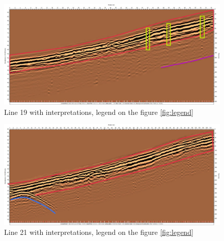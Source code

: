 \begin{figure}
    \centering
    \includegraphics[width=\linewidth]{Images/00_Results/line19_edited.jpg}
    \caption{Line 19 with interpretations, legend on the figure \ref{fig:legend}}
    \label{fig:line19}
\end{figure}

\begin{figure}
    \centering
    \includegraphics[width=\linewidth]{Images/00_Results/line21_edited.jpg}
    \caption{Line 21 with interpretations, legend on the figure \ref{fig:legend}}
    \label{fig:line21}
\end{figure}

